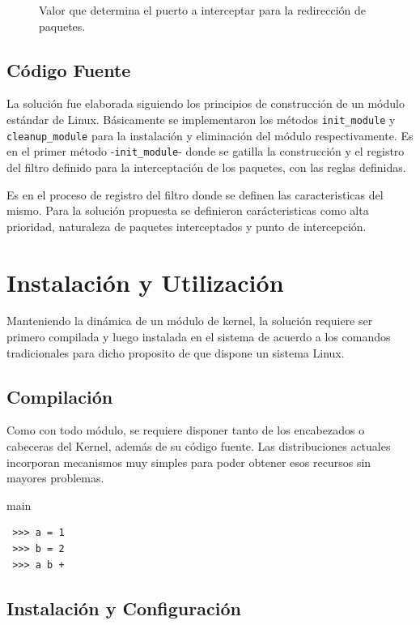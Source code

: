 \begin{description}
\item[] Valor que determina el puerto a interceptar para la redirección de paquetes.
\end{description}




\subsection{Código Fuente}
La solución fue elaborada siguiendo los principios de construcción de un módulo estándar de Linux. Básicamente se implementaron los métodos \verb=init_module= y \verb=cleanup_module= para la instalación y eliminación del módulo respectivamente. Es en el primer método -\verb=init_module=- donde se gatilla la construcción y el registro del filtro definido para la interceptación de los paquetes, con las reglas definidas.

Es en el proceso de registro del filtro donde se definen las caracteristicas del mismo. Para la solución propuesta se definieron carácteristicas como alta prioridad, naturaleza de paquetes interceptados y punto de intercepción.


\section{Instalación y Utilización}
Manteniendo la dinámica de un módulo de kernel, la solución requiere ser primero compilada y luego instalada en el sistema de acuerdo a los comandos tradicionales para dicho proposito de que dispone un sistema Linux.

\subsection{Compilación}
Como con todo módulo, se requiere disponer tanto de los encabezados o cabeceras del Kernel, además de su código fuente. Las distribuciones actuales incorporan mecanismos muy simples para poder obtener esos recursos sin mayores problemas.

\begin{listing}
\caption{main}
\begin{verbatim}
 >>> a = 1 
 >>> b = 2
 >>> a b +
\end{verbatim}
\end{listing}


\subsection{Instalación y Configuración}
